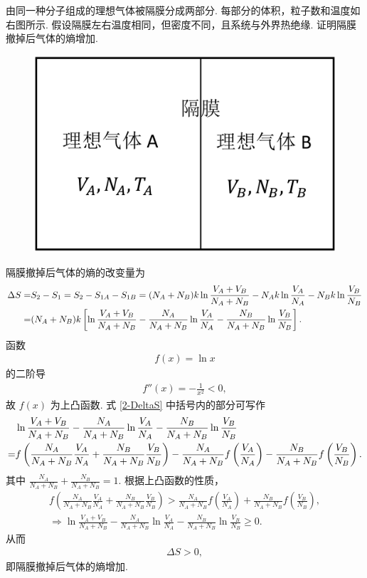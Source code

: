 \documentclass{assignment}
\begin{document}
\begin{prob}
    由同一种分子组成的理想气体被隔膜分成两部分. 每部分的体积，粒子数和温度如右图所示. 假设隔膜左右温度相同，但密度不同，且系统与外界热绝缘. 证明隔膜撤掉后气体的熵增加.
    \begin{figure}[htb]
        \centering
        \includegraphics[width=.4\columnwidth]{A6-P2.png}
    \end{figure}
\end{prob}
\begin{pf}
    隔膜撤掉后气体的熵的改变量为
    \begin{align}
        \label{2-DeltaS}
        \notag\Delta S=&S_2-S_1=S_2-S_{1A}-S_{1B}=(N_A+N_B)k\ln\frac{V_A+V_B}{N_A+N_B}-N_Ak\ln\frac{V_A}{N_A}-N_Bk\ln\frac{V_B}{N_B}\\
        =&(N_A+N_B)k\left[\ln\frac{V_A+V_B}{N_A+N_B}-\frac{N_A}{N_A+N_B}\ln\frac{V_A}{N_A}-\frac{N_B}{N_A+N_B}\ln\frac{V_B}{N_B}\right].
    \end{align}
    函数
    \begin{align}
        f(x)=\ln x
    \end{align}
    的二阶导
    \begin{align}
        f''(x)=-\frac{1}{x^2}<0,
    \end{align}
    故 $f(x)$ 为上凸函数. 式 \eqref{2-DeltaS} 中括号内的部分可写作
    \begin{align}
        \notag&\ln\frac{V_A+V_B}{N_A+N_B}-\frac{N_A}{N_A+N_B}\ln\frac{V_A}{N_A}-\frac{N_B}{N_A+N_B}\ln\frac{V_B}{N_B}\\
        =&f\left(\frac{N_A}{N_A+N_B}\frac{V_A}{N_A}+\frac{N_B}{N_A+N_B}\frac{V_B}{N_B}\right)-\frac{N_A}{N_A+N_B}f\left(\frac{V_A}{N_A}\right)-\frac{N_B}{N_A+N_B}f\left(\frac{V_B}{N_B}\right).
    \end{align}
    其中 $\frac{N_A}{N_A+N_B}+\frac{N_B}{N_A+N_B}=1$. 根据上凸函数的性质，
    \begin{gather}
        f\left(\frac{N_A}{N_A+N_B}\frac{V_A}{N_A}+\frac{N_B}{N_A+N_B}\frac{V_B}{N_B}\right)>\frac{N_A}{N_A+N_B}f\left(\frac{V_A}{N_A}\right)+\frac{N_B}{N_A+N_B}f\left(\frac{V_B}{N_B}\right),\\
        \Longrightarrow\ln\frac{V_A+V_B}{N_A+N_B}-\frac{N_A}{N_A+N_B}\ln\frac{V_A}{N_A}-\frac{N_B}{N_A+N_B}\ln\frac{V_B}{N_B}\geq 0.
    \end{gather}
    从而
    \begin{align}
        \Delta S>0,
    \end{align}
    即隔膜撤掉后气体的熵增加.
\end{pf}
\end{document}
